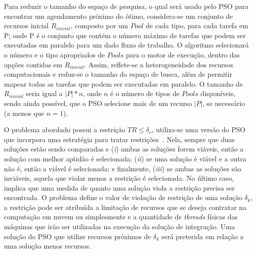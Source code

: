 \documentclass[sigconf]{acmart}
\begin{document}
Para reduzir o tamanho do espaço de pesquisa, o qual será usado pelo PSO para encontrar um agendamento próximo do ótimo, considera-se um conjunto de recursos inicial $R_{inicial}$, composto por um $Pool$ de cada tipo, para cada tarefa em P; onde P é o conjunto que contém o número máximo de tarefas que podem ser executadas em paralelo para um dado fluxo de trabalho. O algoritmo selecionará o número e o tipo apropriados de $Pools$ para o motor de execução, dentro das opções contidas em $R_{inicial}$. Assim, reflete-se a heterogeneidade dos recursos computacionais e reduz-se o tamanho do espaço de busca, além de permitir mapear todas as tarefas que podem ser executadas em paralelo. O tamanho de $R_{inicial}$ seria igual a $\left| P \right|*n$, onde $n$ é o número de tipos de $Pools$ disponíveis, sendo ainda possível, que o PSO selecione mais de um recurso $\left| P \right|$, se necessário (a menos que $n = 1$).

O problema abordado possui a restrição  ${TR \le {\delta _r}} $, utiliza-se uma versão do PSO que incorpora uma estratégia para tratar restrições~\cite{deb2002}. Nela, sempre que duas soluções estão sendo comparadas e (\textit{i}) ambas as soluções forem viáveis, então a solução com melhor aptidão é selecionada; (\textit{ii}) se uma solução é viável e a outra não é, então a viável é selecionada; e finalmente, (\textit{iii}) se ambas as soluções são inviáveis, aquela que violar menos a restrição é selecionada. No último caso, implica que uma medida de quanto uma solução viola a restrição precisa ser encontrada. O problema define o valor de violação de restrição de uma solução $\delta_k $, a restrição pode ser atribuída a limitação de recursos que se deseja contratar na computação em nuvem ou simplesmente e a quantidade de \emph{threads} físicas das máquinas que irão ser utilizadas na execução da solução de integração. Uma solução do PSO que utilize recursos próximos de $\delta_k$ será preterida em relação a uma solução menos recursos.
\end{document}
